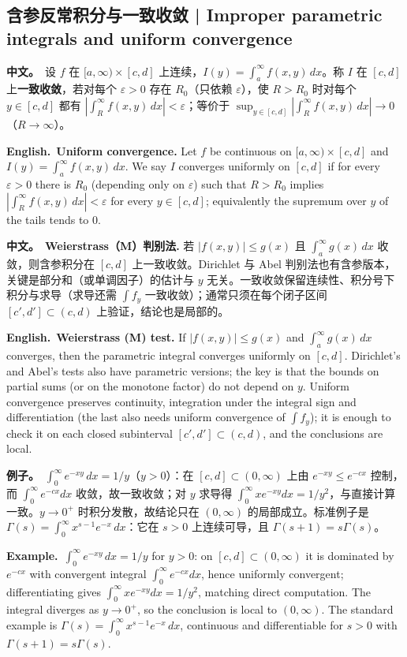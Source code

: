 \documentclass[UTF8,11pt,a4paper]{ctexart}
\newcommand{\BOTH}[2]{\par\noindent\textbf{中文。}\ #1\par\noindent\textbf{English.}\ #2\par}
\newcommand{\EX}[2]{\par\noindent\textbf{例子。}\ #1\par\noindent\textbf{Example.}\ #2\par}
\begin{document}
\subsection{含参反常积分与一致收敛 | Improper parametric integrals and uniform convergence}

\BOTH{设 $f$ 在 $[a,\infty)\times[c,d]$ 上连续，$I(y)=\int_a^\infty f(x,y)\,dx$。称 $I$ 在 $[c,d]$ 上\textbf{一致收敛}，若对每个 $\varepsilon>0$ 存在 $R_0$（只依赖 $\varepsilon$），使 $R>R_0$ 时对每个 $y\in[c,d]$ 都有 $|\int_R^\infty f(x,y)\,dx|<\varepsilon$；等价于 $\sup_{y\in[c,d]}|\int_R^\infty f(x,y)\,dx|\to0$（$R\to\infty$）。}{\textbf{Uniform convergence.} Let $f$ be continuous on $[a,\infty)\times[c,d]$ and $I(y)=\int_a^\infty f(x,y)\,dx$. We say $I$ converges uniformly on $[c,d]$ if for every $\varepsilon>0$ there is $R_0$ (depending only on $\varepsilon$) such that $R>R_0$ implies $|\int_R^\infty f(x,y)\,dx|<\varepsilon$ for every $y\in[c,d]$; equivalently the supremum over $y$ of the tails tends to $0$.}

\BOTH{\textbf{Weierstrass（M）判别法.} 若 $|f(x,y)|\le g(x)$ 且 $\int_a^\infty g(x)\,dx$ 收敛，则含参积分在 $[c,d]$ 上一致收敛。Dirichlet 与 Abel 判别法也有含参版本，关键是部分和（或单调因子）的估计与 $y$ 无关。一致收敛保留连续性、积分号下积分与求导（求导还需 $\int f_y$ 一致收敛）；通常只须在每个闭子区间 $[c',d']\subset(c,d)$ 上验证，结论也是局部的。}{\textbf{Weierstrass (M) test.} If $|f(x,y)|\le g(x)$ and $\int_a^\infty g(x)\,dx$ converges, then the parametric integral converges uniformly on $[c,d]$. Dirichlet's and Abel's tests also have parametric versions; the key is that the bounds on partial sums (or on the monotone factor) do not depend on $y$. Uniform convergence preserves continuity, integration under the integral sign and differentiation (the last also needs uniform convergence of $\int f_y$); it is enough to check it on each closed subinterval $[c',d']\subset(c,d)$, and the conclusions are local.}

\EX{$\int_0^\infty e^{-xy}\,dx=1/y$（$y>0$）：在 $[c,d]\subset(0,\infty)$ 上由 $e^{-xy}\le e^{-cx}$ 控制，而 $\int_0^\infty e^{-cx}dx$ 收敛，故一致收敛；对 $y$ 求导得 $\int_0^\infty xe^{-xy}dx=1/y^2$，与直接计算一致。$y\to0^+$ 时积分发散，故结论只在 $(0,\infty)$ 的局部成立。标准例子是 $\Gamma(s)=\int_0^\infty x^{s-1}e^{-x}\,dx$：它在 $s>0$ 上连续可导，且 $\Gamma(s+1)=s\Gamma(s)$。}{$\int_0^\infty e^{-xy}\,dx=1/y$ for $y>0$: on $[c,d]\subset(0,\infty)$ it is dominated by $e^{-cx}$ with convergent integral $\int_0^\infty e^{-cx}dx$, hence uniformly convergent; differentiating gives $\int_0^\infty xe^{-xy}dx=1/y^2$, matching direct computation. The integral diverges as $y\to0^+$, so the conclusion is local to $(0,\infty)$. The standard example is $\Gamma(s)=\int_0^\infty x^{s-1}e^{-x}\,dx$, continuous and differentiable for $s>0$ with $\Gamma(s+1)=s\Gamma(s)$.}
\end{document}
